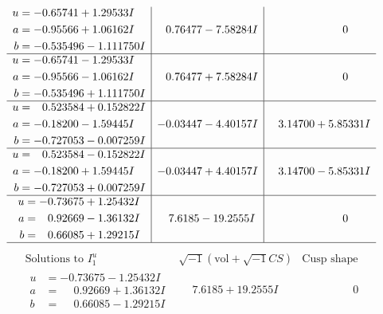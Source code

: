 \documentclass[1p]{elsarticle_modified}
\theoremstyle{definition}
\newcommand{\I}{\sqrt{-1}}
\begin{document}
$$\begin{array}{c|c|c}
\begin{aligned}
u &= -0.65741 + 1.29533 I \\
a &= -0.95566 + 1.06162 I \\
b &= -0.535496 - 1.111750 I\end{aligned}
 & \phantom{-}0.76477 - 7.58284 I & \phantom{-0.000000 } 0 \\ \hline\begin{aligned}
u &= -0.65741 - 1.29533 I \\
a &= -0.95566 - 1.06162 I \\
b &= -0.535496 + 1.111750 I\end{aligned}
 & \phantom{-}0.76477 + 7.58284 I & \phantom{-0.000000 } 0 \\ \hline\begin{aligned}
u &= \phantom{-}0.523584 + 0.152822 I \\
a &= -0.18200 - 1.59445 I \\
b &= -0.727053 - 0.007259 I\end{aligned}
 & -0.03447 - 4.40157 I & \phantom{-}3.14700 + 5.85331 I \\ \hline\begin{aligned}
u &= \phantom{-}0.523584 - 0.152822 I \\
a &= -0.18200 + 1.59445 I \\
b &= -0.727053 + 0.007259 I\end{aligned}
 & -0.03447 + 4.40157 I & \phantom{-}3.14700 - 5.85331 I \\ \hline\begin{aligned}
u &= -0.73675 + 1.25432 I \\
a &= \phantom{-}0.92669 - 1.36132 I \\
b &= \phantom{-}0.66085 + 1.29215 I\end{aligned}
 & \phantom{-}7.6185 - 19.2555 I & \phantom{-0.000000 } 0\\
 \hline 
 \end{array}$$\newpage$$\begin{array}{c|c|c}  
\text{Solutions to }I^u_{1}& \I (\text{vol} + \sqrt{-1}CS) & \text{Cusp shape}\\
 \hline 
\begin{aligned}
u &= -0.73675 - 1.25432 I \\
a &= \phantom{-}0.92669 + 1.36132 I \\
b &= \phantom{-}0.66085 - 1.29215 I\end{aligned}
 & \phantom{-}7.6185 + 19.2555 I & \phantom{-0.000000 } 0 \\ \hline\begin{aligned}

\end{aligned}
\end{array}$$
\end{document}
